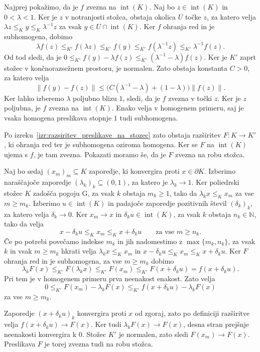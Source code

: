\documentclass[mat2, tisk]{fmfdelo}
\newcommand{\N}{\mathbb{N}}
\begin{document}
\begin{dokaz}
Najprej pokažimo, da je $f$ zvezna na $\operatorname{int}(K)$. Naj bo
$z\in\operatorname{int}(K)$ in $0<\lambda<1$. Ker je $z$ v notranjosti stožca,
obstaja okolica $U$ točke $z$, za katero velja
$\lambda z\leq_K y\leq_K\lambda^{-1}z$ za vsak
$y\in U\cap\operatorname{int}(K)$. Ker $f$ ohranja red in je subhomogena, dobimo
\[
\lambda f(z)\leq_{K'}f(\lambda z)\leq_{K'}f(y)
\leq_{K'}f(\lambda^{-1}z)\leq_{K'}\lambda^{-1}f(z).
\]
Od tod sledi, da je
$0\leq_{K'}f(y)-\lambda f(z)\leq_{K'}(\lambda^{-1}-\lambda)f(z)$.
Ker je $K'$ zaprt stožec v končnorazsežnem prostoru, je normalen.
Zato obstaja konstanta $C>0$, za katero velja
\[
\|f(y)-f(z)\|
\leq \bigl(C(\lambda^{-1}-\lambda)+(1-\lambda)\bigr)\|f(z)\|.
\]
Ker lahko izberemo $\lambda$ poljubno blizu $1$, sledi, da je $f$ zvezna
v točki $z$. Ker je $z$ poljubna, je $f$ zvezna na $\operatorname{int}(K)$.
Enako velja v homogenem primeru, saj je vsaka homogena preslikava
stopnje $1$ tudi subhomogena.

Po izreku~\ref{izr:razsiritev_preslikave_na_stozec} zato obstaja
razširitev $F\colon K\longrightarrow K'$, ki ohranja red ter je
subhomogena oziroma homogena. Ker se $F$ na $\operatorname{int}(K)$
ujema s $f$, je tam zvezna. Pokazati moramo še, da je $F$ zvezna
na robu stožca.

Naj bo sedaj $(x_m)_m\subseteq K$ zaporedje, ki konvergira proti
$x\in\partial K$. Izberimo naraščajoče zaporedje
$(\lambda_k)_k\subseteq(0,1)$, za katero je
$\lambda_k\longrightarrow1$. Ker poliedrski stožec $K$ zadošča
pogoju G, za vsak $k$ obstaja $m_k\geq1$, tako da
$\lambda_k x\leq_K x_m$ za vse $m\geq m_k$.
Izberimo $u\in\operatorname{int}(K)$ in
padajoče zaporedje pozitivnih števil
$(\delta_k)_k$, za katero velja
$\delta_k\longrightarrow0$.
Ker $x_m\longrightarrow x$ in
$\delta_k u\in\operatorname{int}(K)$,
za vsak $k$ obstaja $n_k\in\N$, tako da velja
\[
x-\delta_k u
\leq_K
x_m
\leq_K
x+\delta_k u
\qquad
\text{za vse }m\geq n_k.
\]
Če po potrebi povečamo indekse $m_k$ in
jih nadomestimo z $\max\{m_k,n_k\}$,
za vsak $k$ in vsak $m\geq m_k$ hkrati velja
$\lambda_k x\leq_K x_m$ 
in 
$x-\delta_k u\leq_K x_m\leq_K x+\delta_k u$.
Ker $F$ ohranja red in je subhomogena, za vse $m\geq m_k$ dobimo
\begin{equation*}
\lambda_k F(x)
\leq_{K'}
F(\lambda_k x)
\leq_{K'}
F(x_m)
\leq_{K'}
F(x+\delta_k u)
=
f(x+\delta_k u).
\end{equation*}
Pri tem je v homogenem primeru prva neenakost enakost. Zato velja
\begin{equation*}
0
\leq_{K'}
F(x_m)-\lambda_k F(x)
\leq_{K'}
f(x+\delta_k u)-\lambda_k F(x)
\end{equation*}
za vse $m\geq m_k$.

Zaporedje $(x+\delta_k u)_k$ konvergira proti $x$ od zgoraj, zato po
definiciji razširitve velja
$f(x+\delta_k u)\longrightarrow F(x)$.
Ker tudi $\lambda_k F(x)\longrightarrow F(x)$, desna stran prejšnje
neenakosti konvergira k $0$. Stožec $K'$ je normalen, zato sledi
$F(x_m)\longrightarrow F(x)$. Preslikava $F$ je torej zvezna tudi
na robu stožca.
\end{dokaz}
\end{document}
